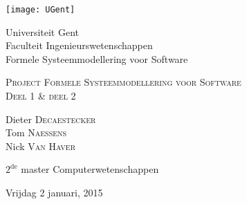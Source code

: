 \begin{titlepage}

\fontsize{12pt}{14pt}
\selectfont

\begin{center}
\texttt{[image: UGent]}

\vspace{1.5cm}
Universiteit Gent \\
Faculteit Ingenieurswetenschappen \\
Formele Systeemmodellering voor Software \\


\vspace{4.0cm}

\fontsize{17.28pt}{21pt}
\selectfont

\textsc{{\Large Project Formele Systeemmodellering voor Software\\
 Deel 1 \& deel 2}}

\fontsize{12pt}{14pt}
\selectfont

\vspace{.6cm}

{\Large 
	Dieter \textsc{Decaestecker} \hfill \\
	Tom \textsc{Naessens} \hfill \\
	Nick \textsc{Van Haver} \hfill \\
} 

\vspace{.6cm}

{ \large
	$2^{\text{de}}$ master Computerwetenschappen
}

\vspace{0.4cm}

Vrijdag 2 januari, 2015
\end{center}

\vspace{5.5cm}


\end{titlepage}

\thispagestyle{empty}
